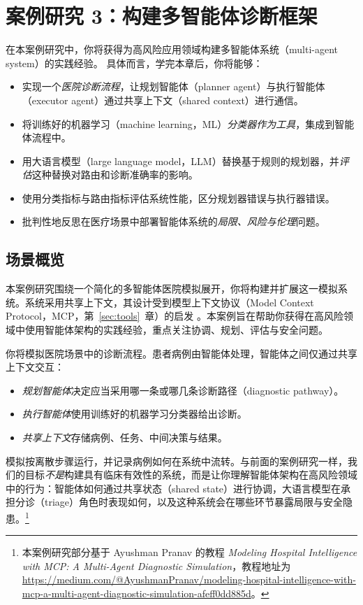 \chapter[案例研究 3：多智能体诊断]{案例研究 3：构建多智能体诊断框架}

\begin{learningbox}
在本案例研究中，你将获得为高风险应用领域构建多智能体系统（multi-agent system）的实践经验。
具体而言，学完本章后，你将能够：
\begin{itemize}[leftmargin=*, nosep]
    \item 实现一个{\em 医院诊断流程}，让规划智能体（planner agent）与执行智能体（executor agent）通过共享上下文（shared context）进行通信。
    \item 将训练好的机器学习（machine learning，ML）{\em 分类器作为工具}，集成到智能体流程中。
    \item 用大语言模型（large language model，LLM）替换基于规则的规划器，并{\em 评估}这种替换对路由和诊断准确率的影响。
    \item 使用分类指标与路由指标评估系统性能，区分规划器错误与执行器错误。
    \item 批判性地反思在医疗场景中部署智能体系统的{\em 局限、风险与伦理}问题。
\end{itemize}
\end{learningbox}


\section{场景概览}

本案例研究围绕一个简化的多智能体医院模拟展开，你将构建并扩展这一模拟系统。系统采用共享上下文，其设计受到模型上下文协议（Model Context Protocol，MCP，第~\ref{sec:tools}~章）的启发 \citep{xinyi2026mcp}。本案例旨在帮助你获得在高风险领域中使用智能体架构的实践经验，重点关注协调、规划、评估与安全问题。

你将模拟医院场景中的诊断流程。患者病例由智能体处理，智能体之间仅通过共享上下文交互：
\begin{itemize}
    \item \textit{规划智能体}决定应当采用哪一条或哪几条诊断路径（diagnostic pathway）。
    \item \textit{执行智能体}使用训练好的机器学习分类器给出诊断。
    \item \textit{共享上下文}存储病例、任务、中间决策与结果。
\end{itemize}
模拟按离散步骤运行，并记录病例如何在系统中流转。与前面的案例研究一样，我们的目标\emph{不是}构建具有临床有效性的系统，而是让你理解智能体架构在高风险领域中的行为：智能体如何通过共享状态（shared state）进行协调，大语言模型在承担分诊（triage）角色时表现如何，以及这种系统会在哪些环节暴露局限与安全隐患。\footnote{本案例研究部分基于 Ayushman Pranav 的教程 \emph{Modeling Hospital Intelligence with MCP: A Multi-Agent Diagnostic Simulation}，教程地址为 \url{https://medium.com/@AyushmanPranav/modeling-hospital-intelligence-with-mcp-a-multi-agent-diagnostic-simulation-afeff0dd885d}。}


